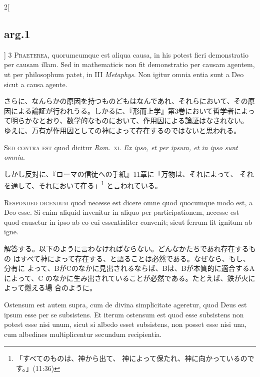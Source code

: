 \documentclass[paper=a4paper,fontsize=10pt,jafontsize=9pt,titlepage]{jlreq}
\begin{document}
\begin{paracol}{2}[\subsection{arg.1}]
3 {\scshape Praeterea}, quorumcumque est aliqua causa, in his potest fieri
 demonstratio per causam illam. Sed in mathematicis non fit demonstratio
 per causam agentem, ut per philosophum patet, in III {\itshape Metaphys}. Non
 igitur omnia entia sunt a Deo sicut a causa agente.

\switchcolumn

さらに、なんらかの原因を持つものどもはなんであれ、それらにおいて、その原
 因による論証が行われうる。しかるに、『形而上学』第3巻において哲学者によっ
 て明らかなとおり、数学的なものにおいて、作用因による論証はなされない。
 ゆえに、万有が作用因としての神によって存在するのではないと思われる。

\switchcolumn*[\subsection{s.c.}]

{\scshape Sed contra est} quod dicitur {\itshape Rom}.~{\scshape xi}. {\itshape Ex ipso, et
 per ipsum, et in ipso sunt omnia}.

\switchcolumn

しかし反対に、『ローマの信徒への手紙』11章に「万物は、それによって、
 それを通して、それにおいて在る」\footnote{「すべてのものは、神から出て、
 神によって保たれ、神に向かっているのです。」(11:36)}
 と言われている。


{\scshape Respondeo dicendum} quod necesse est dicere omne quod quocumque modo est,
 a Deo esse. Si enim aliquid invenitur in aliquo per participationem,
 necesse est quod causetur in ipso ab eo cui essentialiter convenit;
 sicut ferrum fit ignitum ab igne.

\switchcolumn

解答する。以下のように言わなければならない。どんなかたちであれ存在するもの
はすべて神によって存在する、と語ることは必然である。なぜなら、もし、分有に
よって、BがCのなかに見出されるならば、Bは、Bが本質的に適合するAによって、C
のなかに生み出されていることが必然である。たとえば、鉄が火によって燃える場
合のように。

\switchcolumn*

Ostensum est autem supra, cum de
 divina simplicitate ageretur, quod Deus est ipsum esse per se
 subsistens. Et iterum ostensum est quod esse subsistens non potest esse
 nisi unum, sicut si albedo esset subsistens, non posset esse nisi una,
 cum albedines multiplicentur secundum recipientia.


\end{paracol}
\end{document}
